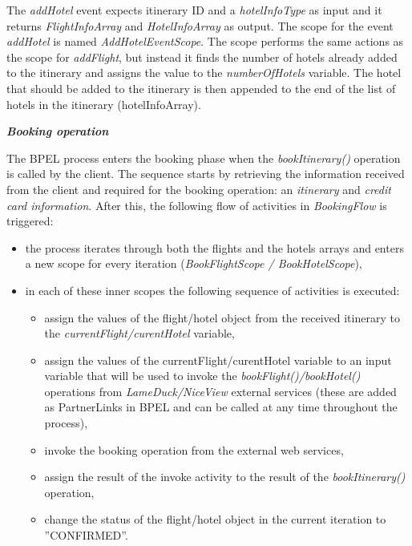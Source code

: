 The \textit{addHotel} event expects itinerary ID and a \textit{hotelInfoType} as input and it returns \textit{FlightInfoArray} and \textit{HotelInfoArray} as output. The scope for the event \textit{addHotel} is named \textit{AddHotelEventScope}. The scope performs the same actions as the scope for \textit{addFlight}, but instead it finds the number of hotels already added to the itinerary and assigns the value to the \textit{numberOfHotels} variable. The hotel that should be added to the itinerary is then appended to the end of the list of hotels in the itinerary (hotelInfoArray).   


\textbf{\textit{Booking operation}}

The BPEL process enters the booking phase when the \textit{bookItinerary()} operation is called by the client. The sequence starts by retrieving the information received from the client and required for the booking operation: an \textit{itinerary} and \textit{credit card information}.  After this, the following flow of activities in \textit{BookingFlow} is triggered:
\begin{itemize}
\item the process iterates through both the flights and the hotels arrays and enters a new scope for every iteration (\textit{BookFlightScope / BookHotelScope}),
\item in each of these inner scopes the following sequence of activities is executed:

\begin{itemize}
\item assign the values of the flight/hotel object from the received itinerary to the \textit{currentFlight/curentHotel} variable,
\item assign the values of the {currentFlight/curentHotel} variable to an input variable that will be used to invoke the \textit{bookFlight()/bookHotel()} operations from \textit{LameDuck/NiceView} external services (these are added as PartnerLinks in BPEL and can be called at any time throughout the process),
\item invoke the booking operation from the external web services,
\item assign the result of the invoke activity to the result of the \textit{bookItinerary()} operation,
\item change the status of the flight/hotel object in the current iteration to ''CONFIRMED''.
\end{itemize}

\end{itemize}

